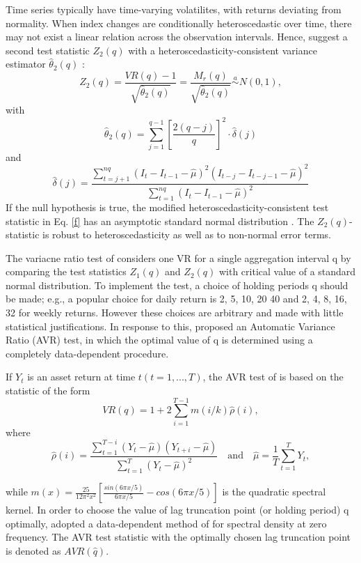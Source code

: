 \documentclass[AEJ,reqno, draftmode]{AEA}
\begin{document}
Time series typically have time-varying volatilites, with returns deviating from normality. When index changes are conditionally heteroscedastic over time, there may not exist a linear relation across the observation intervals. Hence, \citet{lo1988stock} suggest a second test statistic $Z_2(q)$ with a heteroscedasticity-consistent variance estimator $\hat{\theta}_2(q)$ :
\begin{equation} \label{f}
    Z_2(q) = \frac{VR(q)-1}{\sqrt{\hat{\theta}_2(q)}} =  \frac{M_r(q)}{\sqrt{\hat{\theta}_2(q)}} \stackrel{a}{\sim} N(0,1) ,
\end{equation}with
$$ \hat{\theta}_2(q) = \sum_{j=1}^{q-1}\left[\frac{2(q-j)}{q}\right]^2 \cdot \hat{\delta}(j) $$
and
$$ \hat{\delta}(j) = \frac{\sum\limits_{t=j+1}^{nq}(I_t-I_{t-1}-\hat{\mu})^2(I_{t-j}-I_{t-j-1}-\hat{\mu})^2}{\sum\limits_{t=1}^{nq}(I_t-I_{t-1}-\hat{\mu})^2}  $$
If the null hypothesis is true, the modified heteroscedasticity-consistent test statistic in Eq. \eqref{f} has an asymptotic standard normal distribution \citep{liu1991variance}. The $Z_2(q)$-statistic is robust to heteroscedasticity as well as to non-normal error terms. 

The variacne ratio test of \citet{lo1988stock} considers one VR for a single aggregation interval q by comparing the test statistics $Z_1(q)$ and $Z_2(q)$ with critical value of a standard normal distribution. To implement the test, a choice of holding periods q should be made; e.g., a popular choice for daily return is 2, 5, 10, 20 40 and 2, 4, 8, 16, 32 for weekly returns. However these choices are arbitrary and made with little statistical justifications. In response to this, \citet{choi1999testing} proposed an Automatic Variance Ratio (AVR) test, in which the optimal value of q is determined using a completely data-dependent procedure. 

If $Y_t$ is an asset return at time $t(t = 1,...,T)$, the AVR test of \citet{choi1999testing} is based on the statistic of the form
\begin{equation} \label{g}
    VR(q) = 1 + 2\sum_{i=1}^{T-1}m(i/k)\hat{\rho}(i),
\end{equation}where 
$$ \hat{\rho}(i) = \frac{\sum\limits_{t=1}^{T-i}(Y_t-\hat{\mu})(Y_{t+i}-\hat{\mu})}{\sum\limits_{t=1}^{T}(Y_t-\hat{\mu})^2} \quad \textrm{and} \quad \hat{\mu} = \frac{1}{T}\sum_{t=1}^{T}Y_t, $$

while $m(x) = \frac{25}{12\pi^2x^2}\left[\frac{sin(6\pi x/5)}{6\pi x/5}-cos(6\pi x/5)\right]$ is the quadratic spectral kernel. In order to choose the value of lag truncation point (or holding period) q optimally, \citet{choi1999testing} adopted a data-dependent method of \citet{andrews1991heteroskedasticity} for spectral density at zero frequency. The AVR test statistic with the optimally chosen lag truncation point is denoted as $AVR(\hat{q})$. 
\end{document}
